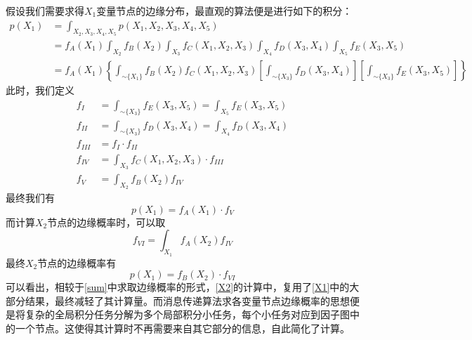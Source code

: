 \documentclass{xdupgthesis}
\begin{document}
假设我们需要求得$X_1$变量节点的边缘分布，最直观的算法便是进行如下的积分：
\begin{equation}
    \label{sum}
    \begin{aligned}
   p\left(X_1\right)&=\int_{X_2,X_3,X_4,X_5} p\left(X_1,X_2,X_3,X_4,X_5\right)\\
   &=f_A(X_1)\int_{X_{2}} f_{B}\left(X_{2}\right) \int_{X_{3}} f_{C}\left(X_{1}, X_{2}, X_{3}\right) \int_{X_{4}} f_{D}\left(X_{3}, X_{4}\right) \int_{X_{5}} f_{E}\left(X_{3}, X_{5}\right)\\
   &=f_A(X_1) \left\{\int_{\sim\{X_1\}}f_{B}\left(X_{2}\right)f_{C}\left(X_{1}, X_{2}, X_{3}\right)\left[\int_{\sim\{X_3\}}f_{D}\left(X_{3}, X_{4}\right)\right]\left[\int_{\sim\{X_3\}}f_{E}\left(X_{3}, X_{5}\right)\right]\right\}
    \end{aligned}
\end{equation}
此时，我们定义
\begin{equation}
    \label{X1}
    \begin{aligned}
        f_I &= \int_{\sim\{X_3\}}f_{E}\left(X_{3}, X_{5}\right)= \int_{X_5}f_{E}\left(X_{3}, X_{5}\right)\\
        f_{II}&=\int_{\sim\{X_3\}}f_{D}\left(X_{3}, X_{4}\right)=\int_{X_4}f_{D}\left(X_{3}, X_{4}\right)\\
        f_{III}& = f_{I}\cdot f_{II}\\
        f_{IV}&=\int_{X_3}f_{C}\left(X_{1}, X_{2}, X_{3}\right)\cdot f_{III}\\
        f_{V}&=\int_{X_2}f_{B}\left(X_{2}\right)f_{IV}
    \end{aligned}
\end{equation}
最终我们有
\begin{equation}
    p\left(X_1\right) = f_A(X_1)\cdot f_{V}
\end{equation}
而计算$X_2$节点的边缘概率时，可以取
\begin{equation}
    f_{VI} = \int_{X_1}f_{A}\left(X_{2}\right)f_{IV}
\end{equation}
最终$X_2$节点的边缘概率有
\begin{equation}
    \label{X2}
    p\left(X_1\right) = f_B(X_2)\cdot f_{VI}
\end{equation}
可以看出，相较于\eqref{sum}中求取边缘概率的形式，\eqref{X2}的计算中，复用了\eqref{X1}中的大部分结果，最终减轻了其计算量。而消息传递算法求各变量节点边缘概率的思想便是将复杂的全局积分任务分解为多个局部积分小任务，每个小任务对应到因子图中的一个节点。这使得其计算时不再需要来自其它部分的信息，自此简化了计算\parencite{factorgraph}。
\end{document}
